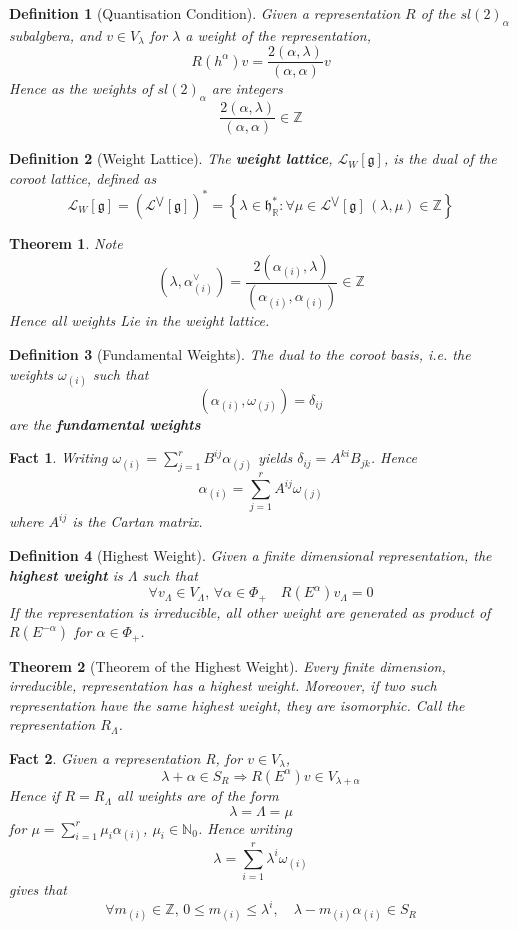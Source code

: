 \documentclass{article}
\newtheorem{theorem}{Theorem}[subsection]
\newtheorem{definition}{Definition}[subsection]
\newtheorem{fact}{Fact}[subsection]
\newcommand{\bam}[1]{\textbf{#1}}
\newcommand{\mf}[1]{\mathfrak{#1}}
\newcommand{\mbb}[1]{\mathbb{#1}}
\begin{document}
\begin{definition}[Quantisation Condition]
Given a representation $R$ of the $sl(2)_\alpha$ subalgbera, and $v\in V_\lambda$ for $\lambda$ a weight of the representation,
\[
R(h^\alpha)v=\frac{2(\alpha,\lambda)}{(\alpha,\alpha)}v
\]
Hence as the weights of $sl(2)_\alpha$ are integers
\[
\frac{2(\alpha,\lambda)}{(\alpha,\alpha)} \in \mbb{Z}
\]
\end{definition}

\begin{definition}[Weight Lattice]
The \bam{weight lattice}, $\mathcal{L}_W [\mf{g}]$, is the dual of the coroot lattice, defined as 
\[
\mathcal{L}_W [\mf{g}] = \left( \mathcal{L}^{\bigvee} [\mf{g}] \right)^\ast = \left\{ \lambda\in\mf{h}^\ast_\mbb{R} : \forall \mu\in\mathcal{L}^{\bigvee} [\mf{g}] \, (\lambda, \mu) \in \mbb{Z} \right\}
\]
\end{definition}

\begin{theorem}
Note 
\[
(\lambda, \alpha^\vee_{(i)})=\frac{2(\alpha_{(i)},\lambda)}{(\alpha_{(i)},\alpha_{(i)})} \in \mbb{Z}
\]
Hence all weights Lie in the weight lattice. 
\end{theorem}

\begin{definition}[Fundamental Weights]
The dual to the coroot basis, i.e. the weights $\omega_{(i)}$ such that 
\[
(\alpha_{(i)}, \omega_{(j)})=\delta_{ij}
\]
are the \bam{fundamental weights}
\end{definition}

\begin{fact}
Writing $\omega_{(i)}=\sum_{j=1}^r B^{ij} \alpha_{(j)}$ yields $\delta_{ij}=A^{ki}B_{jk}$. Hence 
\[
\alpha_{(i)}=\sum_{j=1}^r A^{ij} \omega_{(j)}
\]
where $A^{ij}$ is the Cartan matrix. 
\end{fact}

\begin{definition}[Highest Weight]
Given a finite dimensional representation, the \bam{highest weight} is $\Lambda$ such that 
\[
\forall v_\Lambda\in V_\Lambda, \, \forall \alpha\in\Phi_+ \quad R(E^\alpha)v_\Lambda=0
\]
If the representation is irreducible, all other weight are generated as product of $R(E^{-\alpha})$ for $\alpha\in\Phi_+$. 
\end{definition}

\begin{theorem}[Theorem of the Highest Weight]
Every finite dimension, irreducible, representation has a highest weight. Moreover, if two such representation have the same highest weight, they are isomorphic. Call the representation $R_\Lambda$. 
\end{theorem}

\begin{fact}
Given a representation R, for $v\in V_\lambda$, 
\[
\lambda+\alpha\in S_R \Rightarrow R(E^\alpha)v \in V_{\lambda+\alpha}
\]
Hence if $R=R_\Lambda$ all weights are of the form 
\[
\lambda=\Lambda=\mu
\]
for $\mu=\sum_{i=1}^r \mu_i \alpha_{(i)}$, $\mu_i\in\mbb{N}_0$. Hence writing 
\[
\lambda=\sum_{i=1}^r \lambda^i \omega_{(i)}
\]
gives that
\[
\forall m_{(i)}\in\mbb{Z}, \, 0\leq m_{(i)}\leq \lambda^i, \quad \lambda-m_{(i)}\alpha_{(i)}\in S_R
\]
\end{fact}
\end{document}
